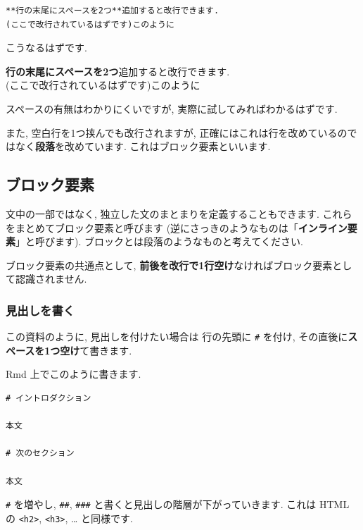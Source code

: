 \documentclass[
]{ltjsarticle}
\newenvironment{infobox}[1]{\begin{itemize}\renewcommand{\labelitemi}{\raisebox{-.7\height}[0pt][0pt]{%
  {\setkeys{Gin}{width=3em,keepaspectratio}\texttt{[image: \_latex/\_img/\#1]}}}}
  \setlength{\fboxsep}{1em}
  \begin{greyblock}
  \item
  }{\end{greyblock}\end{itemize}
}
\begin{document}
\begin{verbatim}
**行の末尾にスペースを2つ**追加すると改行できます.  
(ここで改行されているはずです)このように
\end{verbatim}

こうなるはずです.

\textbf{行の末尾にスペースを2つ}追加すると改行できます.\\
(ここで改行されているはずです)このように

スペースの有無はわかりにくいですが, 実際に試してみればわかるはずです.

また, 空白行を1つ挟んでも改行されますが, 正確にはこれは行を改めているのではなく\textbf{段落}を改めています. これはブロック要素といいます.

\hypertarget{ux30d6ux30edux30c3ux30afux8981ux7d20}{%
\subsection{ブロック要素}\label{ux30d6ux30edux30c3ux30afux8981ux7d20}}

文中の一部ではなく, 独立した文のまとまりを定義することもできます. これらをまとめてブロック要素と呼びます (逆にさっきのようなものは「\textbf{インライン要素}」と呼びます). ブロックとは段落のようなものと考えてください.

\begin{infobox}{important}
ブロック要素の共通点として, \textbf{前後を改行で1行空け}なければブロック要素として認識されません.

\end{infobox}

\hypertarget{ux898bux51faux3057ux3092ux66f8ux304f}{%
\subsubsection{見出しを書く}\label{ux898bux51faux3057ux3092ux66f8ux304f}}

この資料のように, 見出しを付けたい場合は 行の先頭に \texttt{\#} を付け, その直後に\textbf{スペースを1つ空け}て書きます.

Rmd 上でこのように書きます.

\begin{verbatim}
# イントロダクション

本文

# 次のセクション

本文
\end{verbatim}

\texttt{\#} を増やし, \texttt{\#\#}, \texttt{\#\#\#} と書くと見出しの階層が下がっていきます. これは HTML の \texttt{\textless{}h2\textgreater{}}, \texttt{\textless{}h3\textgreater{}}, \ldots{} と同様です.
\end{document}
